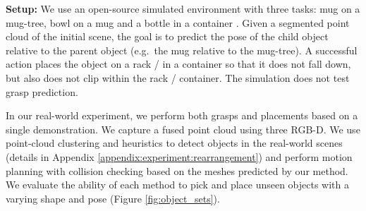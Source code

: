 \documentclass{article}
\begin{document}
\begin{table}[t!]
    \centering
    \caption{Success rates of \hl{real-world} pick-and-place experiments with a single demonstration. The manipulated object (e.g. a mug) starts in an arbitrary pose (we use a stand to get a range of poses) and the target object (e.g. a mug-tree) starts in an arbitrary upright pose. $^1$The target object (e.g. the mug tree) is in a fixed pose for this experiment, as NDF does not handle target object variation. Each entry is measured over 25 - 30 trials with unseen object pairs.}
    \label{tab:real_world}
\end{table}

\textbf{Setup:} We use an open-source simulated environment with three tasks: mug on a mug-tree, bowl on a mug and a bottle in a  container \cite{simeonov22se}. Given a segmented point cloud of the initial scene, the goal is to predict the pose of the child object relative to the parent object (e.g.~the mug relative to the mug-tree). A successful action places the object on a rack / in a container so that it does not fall down, but also does not clip within the rack / container. The simulation does not test grasp prediction.

In our real-world experiment, we perform both grasps and placements based on a single demonstration. We capture a fused point cloud using three RGB-D. We use point-cloud clustering and heuristics to detect objects in the real-world scenes (details in Appendix \ref{appendix:experiment:rearrangement}) and perform motion planning with collision checking based on the meshes predicted by our method. We evaluate the ability of each method to pick and place unseen objects with a varying shape and pose (Figure \ref{fig:object_sets}).
\end{document}

